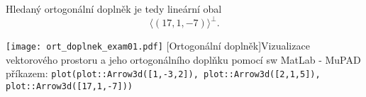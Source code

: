 \begin{example}
  Hledaný ortogonální doplněk je tedy lineární obal $$\langle(17, 1, -7)\rangle^\bot.$$
  
    {\centering
     \captionsetup{type=figure}
    \texttt{[image: ort\_doplnek\_exam01.pdf]}
    [Ortogonální doplněk]{Vizualizace vektorového prostoru a jeho    
             ortogonálního doplňku pomocí sw MatLab - MuPAD příkazem:\newline
             \texttt{plot(plot::Arrow3d([1,-3,2]), plot::Arrow3d([2,1,5]), 
             plot::Arrow3d([17,1,-7]))}}
    \label{LA:fig_ort01}
    \par}
\end{example}
